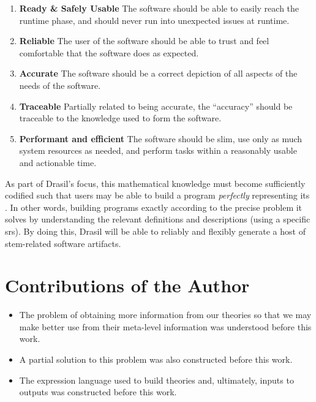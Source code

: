\begin{enumerate}

      \item \textbf{Ready \& Safely Usable} The software should be able to
            easily reach the runtime phase, and should never run into unexpected
            issues at runtime.

      \item \textbf{Reliable} The user of the software should be able to trust
            and feel comfortable that the software does as expected.

      \item \textbf{Accurate} The software should be a correct depiction of all
            aspects of the needs of the software.

      \item \textbf{Traceable} Partially related to being accurate, the
            ``accuracy'' should be traceable to the knowledge used to form the
            software.

      \item \textbf{Performant and efficient} The software should be slim, use
            only as much system resources as needed, and perform tasks within a
            reasonably usable and actionable time.

\end{enumerate}

As part of Drasil's focus, this mathematical knowledge must become sufficiently
codified such that users may be able to build a program \textit{perfectly}
representing its . In other words, building programs exactly according
to the precise problem it solves by understanding the relevant definitions and
descriptions (using a specific \acs{srs}). By doing this, Drasil will be able to
reliably and flexibly generate a host of \acs{stem}-related software artifacts.

\section{Contributions of the Author}
\label{sec:intro:contributions}

\begin{itemize}
      \item The problem of obtaining more information from our theories so that
            we may make better use from their meta-level information was
            understood before this work.
      \item A partial solution to this problem was also constructed before this
            work.
      \item The expression language used to build theories and, ultimately,
            inputs to outputs was constructed before this work.
\end{itemize}

